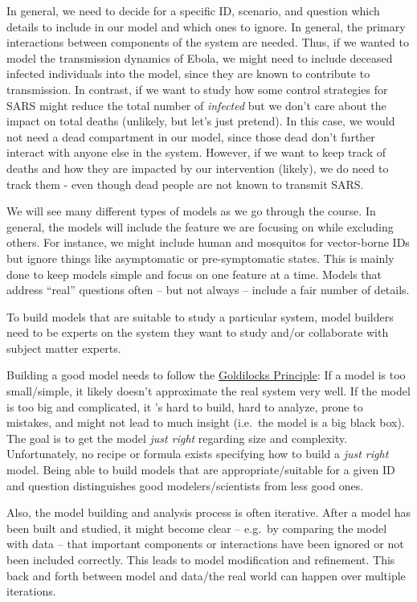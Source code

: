 \documentclass[]{article}
\theoremstyle{definition}
\theoremstyle{definition}
\theoremstyle{definition}
\theoremstyle{remark}
\begin{document}
In general, we need to decide for a specific ID, scenario, and question
which details to include in our model and which ones to ignore. In
general, the primary interactions between components of the system are
needed. Thus, if we wanted to model the transmission dynamics of Ebola,
we might need to include deceased infected individuals into the model,
since they are known to contribute to transmission. In contrast, if we
want to study how some control strategies for SARS might reduce the
total number of \emph{infected} but we don't care about the impact on
total deaths (unlikely, but let's just pretend). In this case, we would
not need a dead compartment in our model, since those dead don't further
interact with anyone else in the system. However, if we want to keep
track of deaths and how they are impacted by our intervention (likely),
we do need to track them - even though dead people are not known to
transmit SARS.

We will see many different types of models as we go through the course.
In general, the models will include the feature we are focusing on while
excluding others. For instance, we might include human and mosquitos for
vector-borne IDs but ignore things like asymptomatic or pre-symptomatic
states. This is mainly done to keep models simple and focus on one
feature at a time. Models that address ``real'' questions often -- but
not always -- include a fair number of details.

To build models that are suitable to study a particular system, model
builders need to be experts on the system they want to study and/or
collaborate with subject matter experts.

Building a good model needs to follow the
\href{https://en.wikipedia.org/wiki/Goldilocks_principle}{Goldilocks
Principle}: If a model is too small/simple, it likely doesn't
approximate the real system very well. If the model is too big and
complicated, it 's hard to build, hard to analyze, prone to mistakes,
and might not lead to much insight (i.e.~the model is a big black box).
The goal is to get the model \emph{just right} regarding size and
complexity. Unfortunately, no recipe or formula exists specifying how to
build a \emph{just right} model. Being able to build models that are
appropriate/suitable for a given ID and question distinguishes good
modelers/scientists from less good ones.

Also, the model building and analysis process is often iterative. After
a model has been built and studied, it might become clear -- e.g.~by
comparing the model with data -- that important components or
interactions have been ignored or not been included correctly. This
leads to model modification and refinement. This back and forth between
model and data/the real world can happen over multiple iterations.
\end{document}
